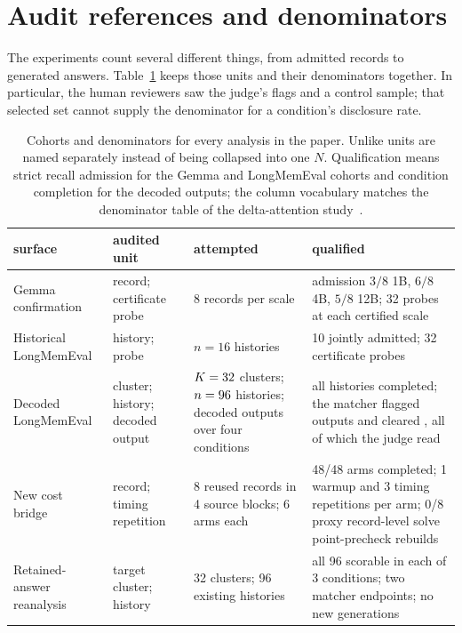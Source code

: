 \section{Audit references and denominators}\label{app:contracts}

The experiments count several different things, from admitted records to
generated answers. Table~\ref{tab:cohort-denominators} keeps those units and
their denominators together. In particular, the human reviewers saw the
judge's flags and a control sample; that selected set cannot supply the
denominator for a condition's disclosure rate.

\begin{table}[htbp]
\centering
\caption{Cohorts and denominators for every analysis in the paper. Unlike
units are named separately instead of being collapsed into one \(N\).
Qualification means strict recall admission for the Gemma and LongMemEval
cohorts and condition completion for the decoded outputs; the column
vocabulary matches the denominator table of the delta-attention study~\citep{kdaomission}.}
\label{tab:cohort-denominators}
\scriptsize
\setlength{\tabcolsep}{3pt}
\begin{tabular}{@{}p{}p{}p{}p{}@{}}
\toprule
surface & audited unit & attempted & qualified \\
\midrule
Gemma confirmation & record; certificate probe &
8 records per scale & admission \(3/8\) 1B, \(6/8\) 4B, \(5/8\) 12B;
32 probes at each certified scale \\
Historical LongMemEval & history; probe &
\(n=16\) histories & 10 jointly admitted; 32 certificate probes \\
Decoded LongMemEval & cluster; history; decoded output &
\(K=32\) clusters; \(n=96\) histories;
\LMChatVThreePopulationN{} decoded outputs over four conditions &
all \LMChatVThreeCompletedN{} histories completed; the matcher flagged
\LMChatVThreeMatcherPositiveN{} outputs and cleared
\LMChatVThreeMatcherCleanN{}, all of which the judge read \\
New cost bridge & record; timing repetition &
8 reused records in 4 source blocks; 6 arms each &
48/48 arms completed; 1 warmup and 3 timing repetitions per arm;
0/8 proxy record-level solve point-precheck rebuilds \\
Retained-answer reanalysis & target cluster; history &
32 clusters; 96 existing histories &
all 96 scorable in each of 3 conditions; two matcher endpoints;
no new generations \\

\end{tabular}
\end{table}
